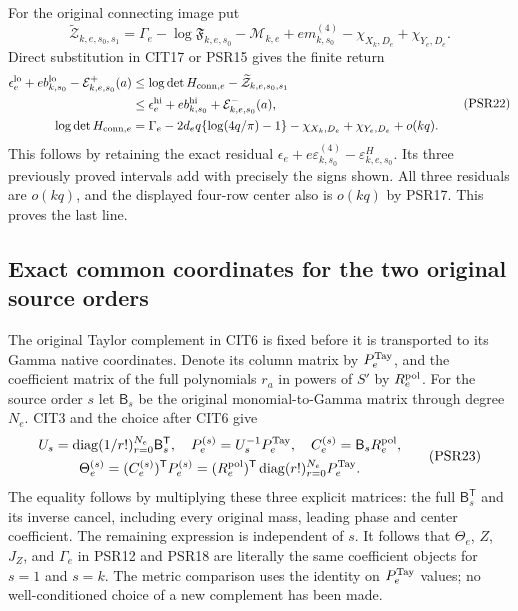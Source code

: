 \documentclass[10pt]{article}
\begin{document}
For the original connecting image put
\[
 \widetilde{\mathcal Z}_{k,e,s_0,s_1}
   =\Gamma_e-\log\mathfrak F_{k,e,s_0}-\mathcal M_{k,e}
      +e m^{(4)}_{k,s_0}-\chi_{X_k,D_e}+\chi_{Y_e,D_e}.
\tag{PSR21}
\]
Direct substitution in CIT17 or PSR15 gives the finite return
\[
\begin{split}
 \epsilon_e^{\rm lo}+e b_{k,s_0}^{\rm lo}
                         -\mathcal E^+_{k,e,s_0}(a)
 &\le\log\det H_{{\rm conn},e}
               -\widetilde{\mathcal Z}_{k,e,s_0,s_1}\\
 &\le\epsilon_e^{\rm hi}+e b_{k,s_0}^{\rm hi}
                         +\mathcal E^-_{k,e,s_0}(a),\\
 \log\det H_{{\rm conn},e}
 &=\Gamma_e-2d_eq\{\log(4q/\pi)-1\}
                  -\chi_{X_k,D_e}+\chi_{Y_e,D_e}+o(kq).
\end{split}\tag{PSR22}
\]
This follows by retaining the exact residual
$\epsilon_e+e\varepsilon^{(4)}_{k,s_0}-\varepsilon^H_{k,e,s_0}$.
Its three previously proved intervals add with precisely the signs
shown. All three residuals are $o(kq)$, and the displayed four-row
center also is $o(kq)$ by PSR17. This proves the last line.

\subsection{Exact common coordinates for the two original source orders}
The original Taylor complement in CIT6 is fixed before it is
transported to its Gamma native coordinates. Denote its column
matrix by $P_e^{\rm Tay}$, and the coefficient matrix of the full
polynomials $r_a$ in powers of $S'$ by $R_e^{\rm pol}$.
For the source order $s$ let $\mathsf B_s$ be the original
monomial-to-Gamma matrix through degree $N_e$. CIT3 and the
choice after CIT6 give
\[
\begin{gathered}
 U_s=\operatorname{diag}(1/r!)_{r=0}^{N_e}\mathsf B_s^{\mathsf T},
 \quad P_e^{(s)}=U_s^{-1}P_e^{\rm Tay},\quad
 C_e^{(s)}=\mathsf B_sR_e^{\rm pol},\\
 \Theta_e^{(s)}=(C_e^{(s)})^{\mathsf T}P_e^{(s)}
 =(R_e^{\rm pol})^{\mathsf T}
       \operatorname{diag}(r!)_{r=0}^{N_e}P_e^{\rm Tay}.
\end{gathered}\tag{PSR23}
\]
The equality follows by multiplying these three explicit matrices:
the full $\mathsf B_s^{\mathsf T}$ and its inverse cancel, including
every original mass, leading phase and center coefficient.
The remaining expression is independent of $s$. It follows that
$\Theta_e$, $Z$, $J_Z$, and $\Gamma_e$ in PSR12 and PSR18 are
literally the same coefficient objects for $s=1$ and $s=k$.
The metric comparison uses the identity on $P_e^{\rm Tay}$ values;
no well-conditioned choice of a new complement has been made.
\end{document}
